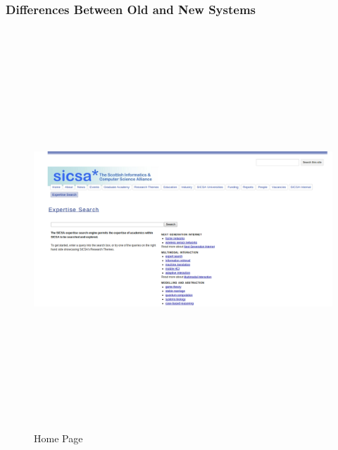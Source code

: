 \subsubsection{Differences Between Old and New Systems}
\begin{figure}[H]
\centering
\includegraphics[width=13cm,height=15cm,keepaspectratio]{./figures/oldsicsa.png}
\caption{Home Page} \label{fig:oldsicsa} 
\end{figure}
